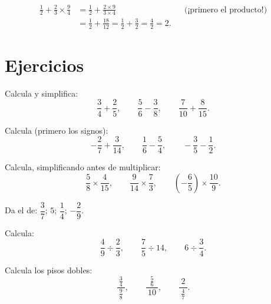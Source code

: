 \begin{example}\label{ex:g8:fractions:mixed}
\begin{align*}
\frac12 + \frac{2}{3} \times \frac{9}{4}
&= \frac12 + \frac{2 \times 9}{3 \times 4}
&& \text{(¡primero el producto!)} \\
&= \frac12 + \frac{18}{12} = \frac12 + \frac32
= \frac{4}{2} = 2 .
\end{align*}
\end{example}

\section{Ejercicios}

\begin{exercise}[$\star$]\label{exo:g8:fractions:1}
Calcula y simplifica:
\[
\frac{3}{4} + \frac{2}{5}, \qquad
\frac{5}{6} - \frac{3}{8}, \qquad
\frac{7}{10} + \frac{8}{15} .
\]
\end{exercise}

\begin{exercise}[$\star$]\label{exo:g8:fractions:2}
Calcula (primero los signos):
\[
-\frac{2}{7} + \frac{3}{14}, \qquad
\frac{1}{6} - \frac{5}{4}, \qquad
-\frac{3}{5} - \frac{1}{2} .
\]
\end{exercise}

\begin{exercise}[$\star$]\label{exo:g8:fractions:3}
Calcula, simplificando antes de multiplicar:
\[
\frac{5}{8} \times \frac{4}{15}, \qquad
\frac{9}{14} \times \frac{7}{3}, \qquad
\left(-\frac{6}{5}\right) \times \frac{10}{9} .
\]
\end{exercise}

\begin{exercise}[$\star$]\label{exo:g8:fractions:4}
Da el  de: $\dfrac{3}{7}$; \quad $5$; \quad
$\dfrac{1}{4}$; \quad $-\dfrac{2}{9}$.
\end{exercise}

\begin{exercise}[$\star$]\label{exo:g8:fractions:5}
Calcula:
\[
\frac{4}{9} \div \frac{2}{3}, \qquad
\frac{7}{5} \div 14, \qquad
6 \div \frac{3}{4} .
\]
\end{exercise}

\begin{exercise}[$\star$]\label{exo:g8:fractions:6}
Calcula los pisos dobles:
\[
\frac{\ \frac{3}{4}\ }{\ \frac{9}{8}\ },
\qquad
\frac{\ \frac{5}{6}\ }{\ 10\ },
\qquad
\frac{\ 2\ }{\ \frac{4}{7}\ } .
\]
\end{exercise}

